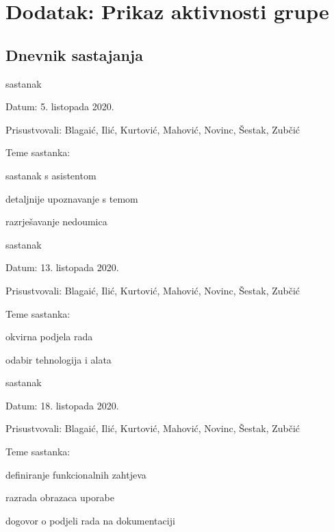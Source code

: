 \chapter*{Dodatak: Prikaz aktivnosti grupe}
		
		\section*{Dnevnik sastajanja}
		
		\begin{packed_enum}
			\item  sastanak
			
			\item[] \begin{packed_item}
				\item Datum: 5. listopada 2020.
				\item Prisustvovali: Blagaić, Ilić, Kurtović, Mahović, Novinc, Šestak, Zubčić
				\item Teme sastanka:
				\begin{packed_item}
					\item  sastanak s asistentom
					\item  detaljnije upoznavanje s temom
					\item  razrješavanje nedoumica
				\end{packed_item}
			\end{packed_item}
			
			\item  sastanak
			\item[] \begin{packed_item}
				\item Datum: 13. listopada 2020.
				\item Prisustvovali: Blagaić, Ilić, Kurtović, Mahović, Novinc, Šestak, Zubčić
				\item Teme sastanka:
				\begin{packed_item}
					\item  okvirna podjela rada
					\item  odabir tehnologija i alata
				\end{packed_item}
			\end{packed_item}
		
			\item  sastanak
			\item[] \begin{packed_item}
				\item Datum: 18. listopada 2020.
				\item Prisustvovali: Blagaić, Ilić, Kurtović, Mahović, Novinc, Šestak, Zubčić
				\item Teme sastanka:
				\begin{packed_item}
					\item  definiranje funkcionalnih zahtjeva
					\item  razrada obrazaca uporabe
					\item  dogovor o podjeli rada na dokumentaciji 
				\end{packed_item}
			\end{packed_item}
		

\end{packed_enum}
